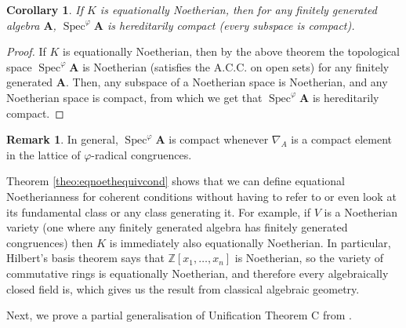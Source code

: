 \documentclass{article}
\theoremstyle{plain}
\newtheorem{corollary}[theorem]{Corollary}
\theoremstyle{definition}
\newtheorem{remark}[theorem]{Remark}
\newcommand{\Spec}{\operatorname{Spec}}
\begin{document}
\begin{corollary}
    If $K$ is equationally Noetherian, then for any finitely generated algebra $\mathbf{A}$, $\Spec^\varphi\mathbf{A}$ is hereditarily compact (every subspace is compact).
\end{corollary}
\begin{proof}
    If $K$ is equationally Noetherian, then by the above theorem the topological space $\Spec^\varphi\mathbf{A}$ is Noetherian (satisfies the A.C.C. on open sets) for any finitely generated $\mathbf{A}$.
    Then, any subspace of a Noetherian space is Noetherian, and any Noetherian space is compact, from which we get that $\Spec^\varphi\mathbf{A}$ is hereditarily compact.
\end{proof}

\begin{remark}
    In general, $\Spec^\varphi \mathbf{A}$ is compact whenever $\nabla_A$ is a compact element in the lattice of $\varphi$-radical congruences.
\end{remark}
 

Theorem \ref{theo:eqnoethequivcond} shows that we can define equational Noetherianness for coherent conditions without having to refer to or even look at its fundamental class or any class generating it.
For example, if $V$ is a Noetherian variety (one where any finitely generated algebra has finitely generated congruences) then $K$ is immediately also equationally Noetherian.
In particular, Hilbert's basis theorem says that $\mathbb{Z}[x_1, \dots, x_n]$ is Noetherian, so the variety of commutative rings is equationally Noetherian, and therefore every algebraically closed field is, which gives us the result from classical algebraic geometry.\par
Next, we prove a partial generalisation of Unification Theorem C from \cite{daniyarova2011algebraicgeometryalgebraicstructures}.
\end{document}
